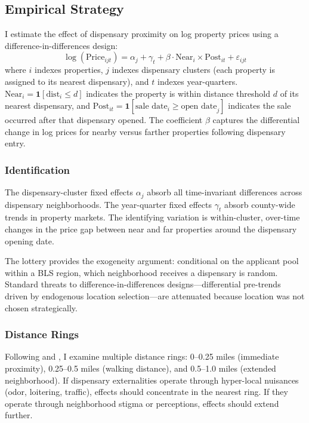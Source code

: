 \documentclass[12pt]{article}
\begin{document}


\subsection{Empirical Strategy}

I estimate the effect of dispensary proximity on log property prices using a difference-in-differences design:
\begin{equation}
\log(\text{Price}_{ijt}) = \alpha_j + \gamma_t + \beta \cdot \text{Near}_i \times \text{Post}_{it} + \varepsilon_{ijt}
\label{eq:did}
\end{equation}
where $i$ indexes properties, $j$ indexes dispensary clusters (each property is assigned to its nearest dispensary), and $t$ indexes year-quarters. $\text{Near}_i = \mathbf{1}[\text{dist}_i \leq d]$ indicates the property is within distance threshold $d$ of its nearest dispensary, and $\text{Post}_{it} = \mathbf{1}[\text{sale date}_i \geq \text{open date}_j]$ indicates the sale occurred after that dispensary opened. The coefficient $\beta$ captures the differential change in log prices for nearby versus farther properties following dispensary entry.

\subsubsection*{Identification} The dispensary-cluster fixed effects $\alpha_j$ absorb all time-invariant differences across dispensary neighborhoods. The year-quarter fixed effects $\gamma_t$ absorb county-wide trends in property markets. The identifying variation is within-cluster, over-time changes in the price gap between near and far properties around the dispensary opening date.

The lottery provides the exogeneity argument: conditional on the applicant pool within a BLS region, which neighborhood receives a dispensary is random. Standard threats to difference-in-differences designs---differential pre-trends driven by endogenous location selection---are attenuated because location was not chosen strategically.

\subsubsection*{Distance Rings} Following \citet{lindenrockoff2008} and \citet{pope2008}, I examine multiple distance rings: 0--0.25 miles (immediate proximity), 0.25--0.5 miles (walking distance), and 0.5--1.0 miles (extended neighborhood). If dispensary externalities operate through hyper-local nuisances (odor, loitering, traffic), effects should concentrate in the nearest ring. If they operate through neighborhood stigma or perceptions, effects should extend further.
\end{document}
